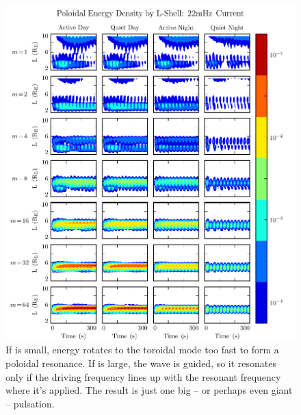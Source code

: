 \begin{figure}[H]
    \centering
    \includegraphics[width=\textwidth]{figures/ucolor_pol_022mHz.pdf}
    \caption[Poloidal Energy Density by L-Shell: 22mHz]{
      If \azm is small, energy rotates to the toroidal mode too fast to form a poloidal resonance. If \azm is large, the \Alfven wave is guided, so it resonates only if the driving frequency lines up with the resonant frequency where it's applied. The result is just one big -- or perhaps even giant -- pulsation. 
    }
    \label{fig_ucolor_pol_022mHz}
\end{figure}

